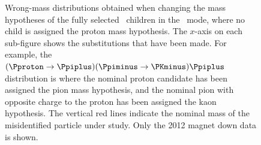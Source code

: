 \begin{figure}
\begin{subfigure}[b]{0.3\textwidth}
    \caption{\decay{\PDsplus}{\Ppiplus\Ppiminus\PKplus}}
    \label{fig:cpv:selection:background_study:ppipi_meson:dsplus_pipik}
  \end{subfigure}
  \caption{%
    Wrong-mass distributions obtained when changing the mass hypotheses of the
    fully selected \PLambdac\ children in the \ppipi\ mode, where no child is
    assigned the proton mass hypothesis.
    The $x$-axis on each sub-figure shows the substitutions that have been
    made.
    For example, the ${(\Pproton \to \Ppiplus)(\Ppiminus \to \PKminus)\Ppiplus}$ distribution is
    where the nominal proton candidate has been assigned the pion mass
    hypothesis, and the nominal pion with opposite charge to the proton has
    been assigned the kaon hypothesis.
    The vertical red lines indicate the nominal mass of the misidentified 
    particle under study.
    Only the 2012 magnet down data is shown.
  }
  \label{fig:cpv:selection:background_study:ppipi_meson}
\end{figure}

